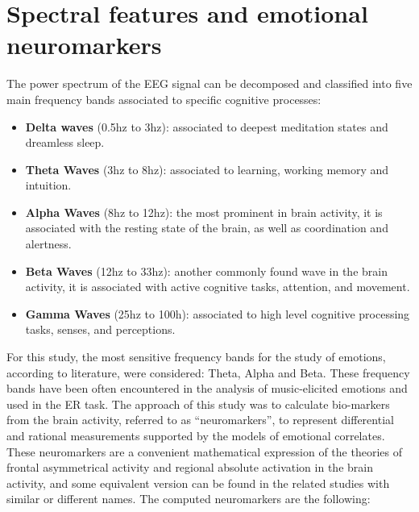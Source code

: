 \section{Spectral features and emotional neuromarkers}
\label{sec:neuromarkers}
The power spectrum of the EEG signal can be decomposed and classified into five main frequency bands associated to specific cognitive processes: 
\begin{itemize}
\item  	\textbf{Delta waves} (0.5hz to 3hz): associated to deepest meditation states and dreamless sleep.
\item 	\textbf{Theta Waves} (3hz to 8hz): associated to learning, working memory and intuition.
\item 	\textbf{Alpha Waves} (8hz to 12hz): the most prominent in brain activity, it is associated with the resting state of the brain, as well as coordination and alertness.
\item 	\textbf{Beta Waves} (12hz to 33hz): another commonly found wave in the brain activity, it is associated with active cognitive tasks, attention, and movement.
\item 	\textbf{Gamma Waves} (25hz to 100h): associated to high level cognitive processing tasks, senses, and perceptions.
\end{itemize}
For this study, the most sensitive frequency bands for the study of emotions, according to literature, were considered: Theta, Alpha and Beta. These frequency bands have been often encountered in the analysis of music-elicited emotions and used in the \ac{ER} task. The approach of this study was to calculate bio-markers from the brain activity, referred to as “neuromarkers”, to represent differential and rational measurements supported by the models of emotional correlates. These neuromarkers are a convenient mathematical expression of the theories of frontal asymmetrical activity and regional absolute activation in the brain activity, and some equivalent version can be found in the related studies with similar or different names. The computed neuromarkers are the following:
	
